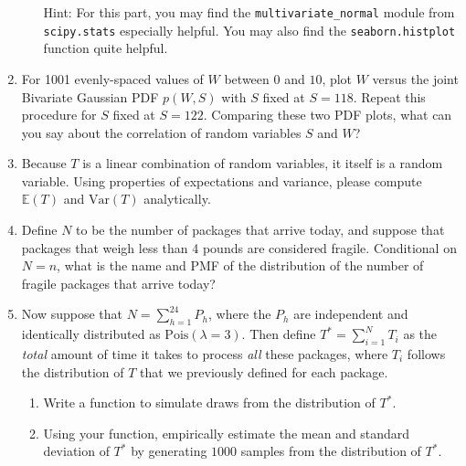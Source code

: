 \documentclass{../harvardml}
\theoremstyle{definition}
\theoremstyle{plain}
\begin{document}
\begin{problem}
\begin{enumerate}
\begin{enumerate}
        Hint: For this part, you may find the \texttt{multivariate\_normal} module from \texttt{scipy.stats} especially helpful. You may also find the \texttt{seaborn.histplot} function quite helpful. 
    \end{enumerate}
    
    \item For 1001 evenly-spaced values of $W$ between $0$ and $10$, plot $W$ versus the joint Bivariate Gaussian PDF $p(W, S)$ with $S$ fixed at $S=118$. Repeat this procedure for $S$ fixed at $S=122$. Comparing these two PDF plots, what can you say about the correlation of random variables $S$ and $W$? 
    
    \item Because $T$ is a linear combination of random variables, it itself is a random variable. Using properties of expectations and variance, please compute $\mathbb{E}(T)$ and $\mathrm{Var}(T)$ analytically.
    
    \item Define $N$ to be the number of packages that arrive today, and suppose that packages that weigh less than 4 pounds are considered fragile. Conditional on $N=n$, what is the name and PMF of the distribution of the number of fragile packages that arrive today?
    
    \item Now suppose that $N = \sum_{h=1}^{24}P_h$, where the $P_h$ are independent and identically distributed as $\text{Pois}(\lambda=3)$. Then define $T^* = \sum_{i=1}^{N} T_i$ as the  \textit{total} amount of time it takes to process \textit{all} these packages, where $T_i$ follows the distribution of $T$ that we previously defined for each package.
    \begin{enumerate}
        \item Write a function to simulate draws from the distribution of $T^{*}$. 
        \item Using your function, empirically estimate the mean and standard deviation of $T^{*}$ by generating $1000$ samples from the distribution of $T^{*}$.
    \end{enumerate}

\end{enumerate}
\end{problem}



\newpage
\end{document}
